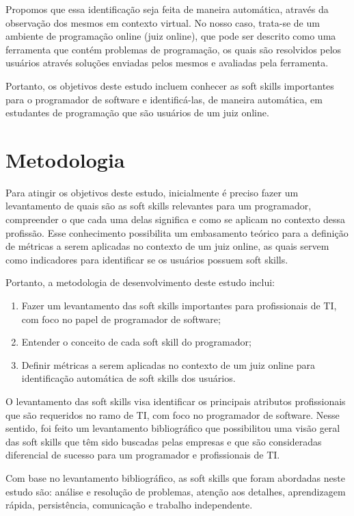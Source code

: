Propomos que essa identificação seja feita de maneira automática, através da observação dos mesmos em contexto virtual. No nosso caso, trata-se de um ambiente de programação online (juiz online), que pode ser descrito como uma ferramenta que contém problemas de programação, os quais são resolvidos pelos usuários através soluções enviadas pelos mesmos e avaliadas pela ferramenta.

Portanto, os objetivos deste estudo incluem conhecer as soft skills importantes para o programador de software e identificá-las, de maneira automática, em estudantes de programação que são usuários de um juiz online.

\section{Metodologia}

Para atingir os objetivos deste estudo, inicialmente é preciso fazer um levantamento de quais são as soft skills relevantes para um programador, compreender o que cada uma delas significa e como se aplicam no contexto dessa profissão. Esse conhecimento possibilita um embasamento teórico para a definição de métricas a serem aplicadas no contexto de um juiz online, as quais servem como indicadores para identificar se os usuários possuem soft skills.

Portanto, a metodologia de desenvolvimento deste estudo inclui: 

\begin{enumerate}[label={(\roman*)}]
	\item Fazer um levantamento das soft skills importantes para profissionais de TI, com foco no papel de programador de software;
	\item Entender o conceito de cada soft skill do programador;
	\item Definir métricas a serem aplicadas no contexto de um juiz online para identificação automática de soft skills dos usuários.
\end{enumerate}

O levantamento das soft skills visa identificar os principais atributos profissionais que são requeridos no ramo de TI, com foco no programador de software. Nesse sentido, foi feito um levantamento bibliográfico que possibilitou uma visão geral das soft skills que têm sido buscadas pelas empresas e que são consideradas diferencial de sucesso para um programador e profissionais de TI.

Com base no levantamento bibliográfico, as soft skills que foram abordadas neste estudo são: análise e resolução de problemas, atenção aos detalhes, aprendizagem rápida, persistência, comunicação e trabalho independente. 

